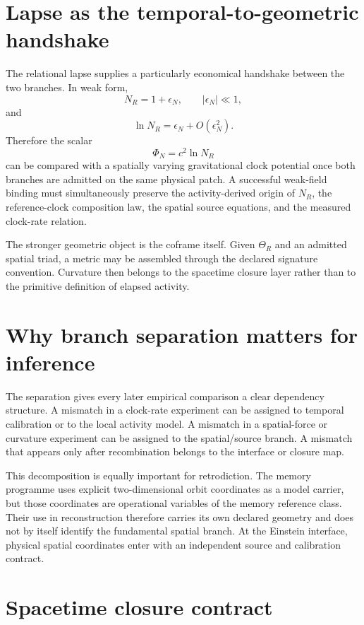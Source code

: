 \section{Lapse as the temporal-to-geometric handshake}

The relational lapse supplies a particularly economical handshake between the two branches. In weak form,
\[
N_R=1+\epsilon_N,
\qquad
|\epsilon_N|\ll1,
\]
and
\[
\ln N_R=\epsilon_N+O(\epsilon_N^2).
\]
Therefore the scalar
\[
\Phi_N=c^2\ln N_R
\]
can be compared with a spatially varying gravitational clock potential once both branches are admitted on the same physical patch. A successful weak-field binding must simultaneously preserve the activity-derived origin of \(N_R\), the reference-clock composition law, the spatial source equations, and the measured clock-rate relation.

The stronger geometric object is the coframe itself. Given \(\Theta_R\) and an admitted spatial triad, a metric may be assembled through the declared signature convention. Curvature then belongs to the spacetime closure layer rather than to the primitive definition of elapsed activity.

\section{Why branch separation matters for inference}

The separation gives every later empirical comparison a clear dependency structure. A mismatch in a clock-rate experiment can be assigned to temporal calibration or to the local activity model. A mismatch in a spatial-force or curvature experiment can be assigned to the spatial/source branch. A mismatch that appears only after recombination belongs to the interface or closure map.

This decomposition is equally important for retrodiction. The memory programme uses explicit two-dimensional orbit coordinates as a model carrier, but those coordinates are operational variables of the memory reference class. Their use in reconstruction therefore carries its own declared geometry and does not by itself identify the fundamental spatial branch. At the Einstein interface, physical spatial coordinates enter with an independent source and calibration contract.

\section{Spacetime closure contract}

